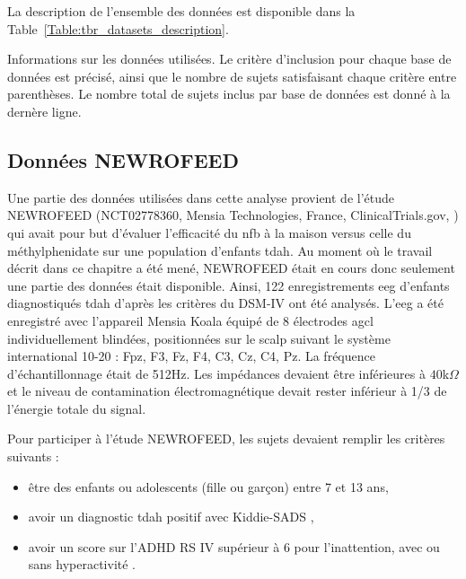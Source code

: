 La description de l'ensemble des données est disponible dans la Table~\ref{Table:tbr_datasets_description}.

\begin{table}[h!]
  \centering
  \caption{Informations sur les données utilisées. Le critère d'inclusion pour chaque base de données est précisé, ainsi que le nombre de sujets satisfaisant
	chaque critère entre parenthèses. Le nombre total de sujets inclus par base de données est donné à la dernère ligne.}
  
  \label{Table:tbr_datasets_description}
\end{table}

\subsection{Données NEWROFEED}

Une partie des données utilisées dans cette analyse provient de l'étude NEWROFEED (NCT02778360, Mensia Technologies, France, ClinicalTrials.gov, \citet{Bioulac2019})
qui avait pour but d'évaluer l'efficacité du \gls{nfb} à la maison versus celle du méthylphenidate sur une population d'enfants \gls{tdah}.
Au moment où le travail décrit dans ce chapitre a été mené, NEWROFEED était en cours donc 
seulement une partie des données était disponible. Ainsi, 122 enregistrements \gls{eeg} d'enfants diagnostiqués \gls{tdah} d'après les critères du DSM-IV \citep{DSM-4} 
ont été analysés. L'\gls{eeg} a été enregistré avec l'appareil Mensia Koala équipé de 8 électrodes \gls{agcl} individuellement blindées, positionnées sur le scalp suivant
le système international 10-20 : Fpz, F3, Fz, F4, C3, Cz, C4, Pz. La fréquence d'échantillonnage était de 512Hz. Les impédances devaient être
inférieures à $40$k$\Omega$ et le niveau de contamination électromagnétique devait rester inférieur à 1/3 de l'énergie totale du signal. 

Pour participer à l'étude NEWROFEED, les sujets devaient remplir les critères suivants :
\begin{itemize}
\item être des enfants ou adolescents (fille ou garçon) entre 7 et 13 ans,
\item avoir un diagnostic \gls{tdah} positif avec Kiddie-SADS \citep{Kaufman1997},
\item avoir un score sur l'ADHD RS IV supérieur à 6 pour l'inattention, avec ou sans hyperactivité \citep{Pappas2006}.
\end{itemize}

